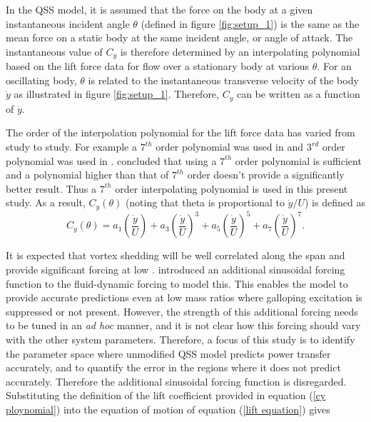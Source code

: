 

In the QSS model, it is assumed that the force on the body at a given instantaneous incident angle $\theta$ (defined in figure \ref{fig:setup_1}) is the same as the mean force on a static body at the same incident angle, or angle of attack. The instantaneous value of $C_y$ is therefore determined by an interpolating polynomial based on the lift force data for flow over a stationary body at various $\theta$. For an oscillating body, $\theta$ is related to the  instantaneous transverse velocity of the body $\dot{y}$ as illustrated in figure \ref{fig:setup_1}. Therefore, $C_y$ can be written as a function of $\dot{y}$.

The order of the interpolation polynomial for the lift force data has varied from study to study. For  example a $7^{th}$ order polynomial was used in \cite{Parkinson1964} and $3^{rd}$ order polynomial was used in \cite{Barrero-Gil2009}. \cite{Ng2005} concluded that using a $7^{th}$ order polynomial is sufficient and a polynomial higher than that of $7^{th}$ order doesn't provide a significantly better result. Thus a $7 ^{th}$ order interpolating polynomial is used in this present study. As a result, $C_y(\theta)$ (noting that theta is proportional to $\dot{y}/U$) is defined as
\begin{equation}
\label{cy ploynomial}
C_y(\theta)=a_1\left(\frac{\dot{y}}{U}\right)+a_3\left(\frac{\dot{y}}{U}\right)^3+a_5\left(\frac{\dot{y}}{U}\right)^5+a_7\left(\frac{\dot{y}}{U}\right)^7.
\end{equation}


 It is expected that vortex shedding will be well correlated along the span and provide significant forcing at low \reynoldsnumber. \citet{Joly2012} introduced  an additional sinusoidal forcing function to the fluid-dynamic forcing to model this. This enables the model to provide accurate predictions even at low mass ratios where galloping excitation is suppressed or not present. However, the strength of this additional forcing needs to be tuned in an \emph{ad hoc} manner, and it is not clear how this forcing should vary with the other system parameters. Therefore, a focus of this study is to identify the parameter space where unmodified QSS model predicts power transfer accurately, and to quantify the error in the regions where it does not predict accurately. Therefore the additional sinusoidal forcing function is disregarded. Substituting the definition of the lift coefficient provided in equation (\ref{cy ploynomial}) into the equation of motion of equation (\ref{lift equation}) gives 
 
